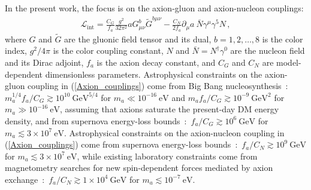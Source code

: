 In the present work, the focus is on the axion-gluon and axion-nucleon couplings:
\begin{align}
\label{Axion_couplings}
\mathcal{L}_{\textrm{int}} = \frac{C_G}{f_a} \frac{g^2}{32\pi^2} a G^{b}_{\mu \nu} \tilde{G}^{b \mu \nu}  - \frac{C_N}{2f_a} \partial_\mu a ~ \bar{N} \gamma^\mu \gamma^5 N \, ,
\end{align}
where $G$ and $\tilde{G}$ are the gluonic field tensor and its dual, $b=1,2,\ldots,8$ is the  color index, $g^2 / 4 \pi$ is the color coupling constant, {\color{black}$N$ and $\bar{N} = N^\dagger \gamma^0$ are the nucleon field and its Dirac adjoint,} $f_a$ is the axion decay constant, and $C_G$ and {\color{black}$C_N$} are model-dependent dimensionless parameters.
Astrophysical constraints on the axion-gluon coupling in (\ref{Axion_couplings}) come from Big Bang nucleosynthesis~\cite{Blum2014,StadnikThesis,Stadnik2015D}:~$m_a^{1/4} f_a / C_G \gtrsim 10^{10}~\textrm{GeV}^{5/4}$ for $m_a \ll 10^{-16}~\textrm{eV}$ and $m_a f_a / C_G \gtrsim 10^{-9}~\textrm{GeV}^{2}$ for $m_a \gg 10^{-16}~\textrm{eV}$, assuming that axions saturate the present-day DM energy density,
and from supernova energy-loss bounds~\cite{Graham2013,Raffelt1990Review}:~$f_a / C_G \gtrsim 10^6 ~\textrm{GeV}$ for $m_a \lesssim 3 \times 10^{7}~\textrm{eV}$.
{\color{black}Astrophysical constraints on the axion-nucleon coupling in (\ref{Axion_couplings}) come from supernova energy-loss bounds~\cite{Raffelt1990Review,Raffelt2008LNP}:~$f_a / C_N \gtrsim 10^9 ~\textrm{GeV}$ for $m_a \lesssim 3 \times 10^{7}~\textrm{eV}$, while existing laboratory constraints come from magnetometry searches for new spin-dependent forces mediated by axion exchange~\cite{Romalis2009_NF}:~$f_a / C_N \gtrsim 1 \times 10^4 ~\textrm{GeV}$ for $m_a \lesssim 10^{-7}~\textrm{eV}$. }

